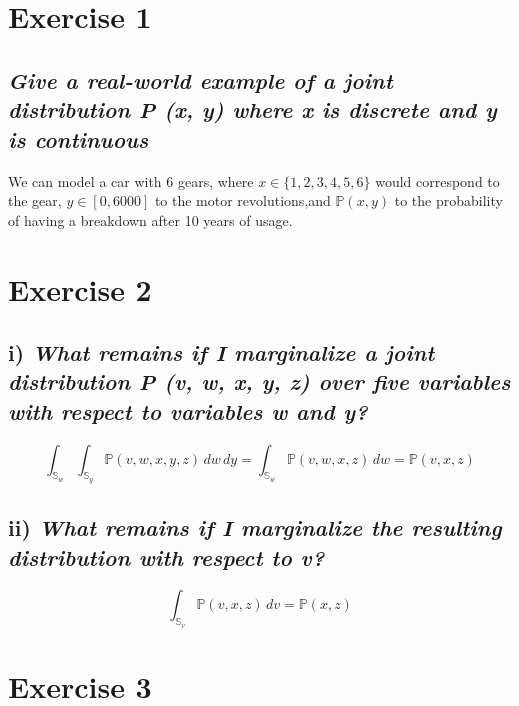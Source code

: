 \documentclass[11pt]{scrartcl} %
\begin{document}
\section*{\\[3mm]Exercise 1}
\subsection*{{\it Give a real-world example of a joint distribution P (x, y) where x is discrete and y is continuous}}
        We can model a car with 6 gears, where \(x\in\{1,2,3,4,5,6\}\) would correspond to the gear, \(y\in [0, 6000]\) to the motor revolutions,and \(\mathbb{P}(x, y)\) to the probability of having a breakdown after 10 years of usage.



        \vspace{5mm}
	\section*{Exercise 2}

	\subsection*{i) {\it What remains if I marginalize a joint distribution P (v, w, x, y, z) over five variables with respect to variables w and y?}}
        \begin{equation}
          {\displaystyle \int_{\mathbb{S}_w} \int_{\mathbb{S}_y}} \mathbb{P}(v,w,x,y,z) \,dw\,dy =
          {\displaystyle \int_{\mathbb{S}_w}} \mathbb{P}(v,w,x,z) \,dw =
          \mathbb{P}(v,x,z)
        \end{equation}

        \subsection*{ii) {\it What remains if I marginalize the resulting distribution with respect to v?}}
        \begin{equation}
          {\displaystyle \int_{\mathbb{S}_v}} \mathbb{P}(v,x,z) \,dv =
          \mathbb{P}(x,z)
        \end{equation}



        \vspace{5mm}
	\section*{Exercise 3}
\end{document}
